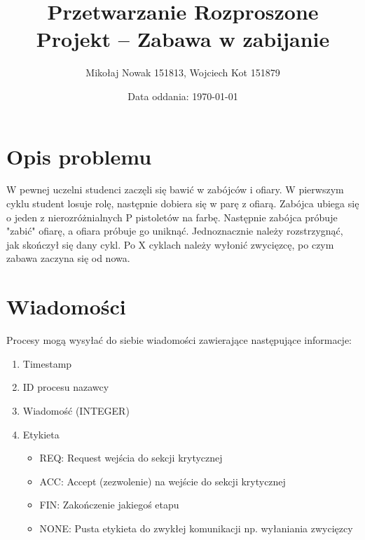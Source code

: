 \documentclass[11pt]{article}
\title{Przetwarzanie Rozproszone\\ Projekt -- Zabawa w zabijanie}
\author{Mikołaj Nowak 151813, Wojciech Kot 151879}
\date{Data oddania: \today}
\begin{document}
\maketitle

\newpage

\section{Opis problemu}

W pewnej uczelni studenci zaczęli się bawić w zabójców i ofiary. W pierwszym cyklu student losuje rolę, następnie dobiera się w parę z ofiarą. Zabójca ubiega się o jeden z nierozróżnialnych P pistoletów na farbę. Następnie zabójca próbuje "zabić" ofiarę, a ofiara próbuje go uniknąć. Jednoznacznie należy rozstrzygnąć, jak skończył się dany cykl. Po X cyklach należy wyłonić zwycięzcę, po czym zabawa zaczyna się od nowa.

\section{Wiadomości}
Procesy mogą wysyłać do siebie wiadomości zawierające następujące informacje:
\begin{enumerate}
    \item Timestamp
    \item ID procesu nazawcy
    \item Wiadomość (INTEGER)
    \item Etykieta
    \begin{itemize}
        \item REQ: Request wejścia do sekcji krytycznej
        \item ACC: Accept (zezwolenie) na wejście do sekcji krytycznej
        \item FIN: Zakończenie jakiegoś etapu
        \item NONE: Pusta etykieta do zwykłej komunikacji np. wyłaniania zwycięzcy
    \end{itemize}
\end{enumerate}
\end{document}
